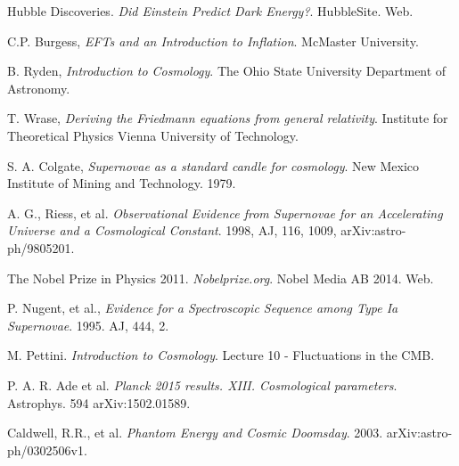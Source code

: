 \documentclass[12pt]{article}
\begin{document}
	\begin{thebibliography}{999}
	
	Hubble Discoveries. 
	\emph{Did Einstein Predict Dark Energy?}. 
	HubbleSite. Web.
	
  	C.P. Burgess,
  	\emph{EFTs and an Introduction to Inflation}.
  	McMaster University.
	
	B. Ryden, 
	\emph{Introduction to Cosmology}.
	The Ohio State University Department of Astronomy.
	
	T. Wrase,
	\emph{Deriving the Friedmann equations from general relativity}.
	Institute for Theoretical Physics Vienna University of Technology.
	
	S. A. Colgate, 
	\emph{Supernovae as a standard candle for cosmology}.
	New Mexico Institute of Mining and Technology. 1979.	
	
	A. G., Riess, et al.
	\emph{Observational Evidence from Supernovae for an Accelerating Universe and a Cosmological Constant}.
	1998, AJ, 116, 1009, arXiv:astro-ph/9805201.
	
	The Nobel Prize in Physics 2011. 
	\emph{Nobelprize.org}.
	Nobel Media AB 2014. Web. 
	
	P. Nugent, et al., 
	\emph{Evidence for a Spectroscopic Sequence among Type Ia Supernovae}.
	1995. AJ, 444, 2.
	
	M. Pettini. 
	\emph{Introduction to Cosmology}.
	Lecture 10 - Fluctuations in the CMB.
	
	 P. A. R. Ade et al. 
	\emph{Planck 2015 results. XIII. Cosmological parameters}.
	Astrophys. 594 arXiv:1502.01589. 
	
	 Caldwell, R.R., et al.
	 \emph{Phantom Energy and Cosmic Doomsday}.
	 2003. arXiv:astro-ph/0302506v1.

	


\end{thebibliography}
\end{document}
